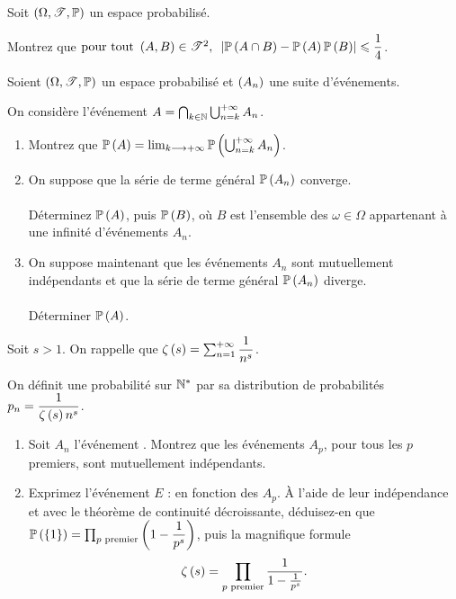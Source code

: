 \begin{exoss}
Soit \(\anneau{\Omega}[\fami{T}][\prem]\) un espace probabilisé.

Montrez que \(\quantifs{\tpt\paren{A,B}\in\fami{T}^2}\abs{\proba{A\inter B}-\proba{A}\proba{B}}\leq\dfrac{1}{4}\).
\end{exoss}

\begin{exoss}
Soient \(\anneau{\Omega}[\fami{T}][\prem]\) un espace probabilisé et \(\left(A_n\right)\) une suite d'événements.

On considère l'événement \(A=\bigcap_{k\in\mathbb{N}}\bigcup_{n=k}^{+\infty}A_n\).

\begin{enumerate}
    \item Montrez que \(\mathbb{P}\left(A\right)=\lim_{k\longrightarrow+\infty}\mathbb{P}\left(\bigcup_{n=k}^{+\infty}A_n\right)\). \\
    \item On suppose que la série de terme général \(\mathbb{P}\left(A_n\right)\) converge. \\\\ Déterminez \(\mathbb{P}\left(A\right)\), puis \(\mathbb{P}\left(B\right)\), où \(B\) est l'ensemble des \(\omega\in\Omega\) appartenant à une infinité d'événements \(A_n\). \\
    \item On suppose maintenant que les événements \(A_n\) sont mutuellement indépendants et que la série de terme général \(\mathbb{P}\left(A_n\right)\) diverge. \\\\ Déterminer \(\mathbb{P}\left(A\right)\).
\end{enumerate}
\end{exoss}

\begin{exoss}
Soit \(s>1\). On rappelle que \(\zeta\left(s\right)=\sum_{n=1}^{+\infty}\dfrac{1}{n^s}\).

On définit une probabilité sur \(\mathbb{N}^*\) par sa distribution de probabilités \(p_n=\dfrac{1}{\zeta\left(s\right)n^s}\).

\begin{enumerate}
    \item Soit \(A_n\) l'événement . Montrez que les événements \(A_p\), pour tous les \(p\) premiers, sont mutuellement indépendants. \\
    \item Exprimez l'événement \(E\) :  en fonction des \(A_p\). À l'aide de leur indépendance et avec le théorème de continuité décroissante, déduisez-en que \(\mathbb{P}\left(\left\lbrace1\right\rbrace\right)=\prod_{p\text{ premier}}\left(1-\dfrac{1}{p^s}\right)\), puis la magnifique formule \[\zeta\left(s\right)=\prod_{p\text{ premier}}\dfrac{1}{1-\frac{1}{p^s}}.\]
\end{enumerate}
\end{exoss}


